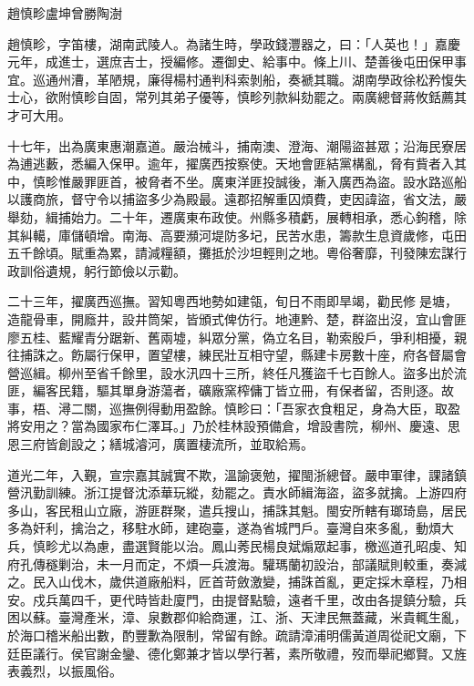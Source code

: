 
\begin{pinyinscope}
趙慎畛盧坤曾勝陶澍

趙慎畛，字笛樓，湖南武陵人。為諸生時，學政錢灃器之，曰：「人英也！」嘉慶元年，成進士，選庶吉士，授編修。遷御史、給事中。條上川、楚善後屯田保甲事宜。巡通州漕，革陋規，廉得楊村通判科索剝船，奏褫其職。湖南學政徐松矜愎失士心，欲附慎畛自固，常列其弟子優等，慎畛列款糾劾罷之。兩廣總督蔣攸銛薦其才可大用。

十七年，出為廣東惠潮嘉道。嚴治械斗，捕南澳、澄海、潮陽盜甚眾；沿海民寮居為逋逃藪，悉編入保甲。逾年，擢廣西按察使。天地會匪結黨構亂，脅有貲者入其中，慎畛惟嚴罪匪首，被脅者不坐。廣東洋匪投誠後，漸入廣西為盜。設水路巡船以護商旅，督守令以捕盜多少為殿最。遠郡招解重囚煩費，吏因諱盜，省文法，嚴舉劾，緝捕始力。二十年，遷廣東布政使。州縣多積虧，展轉相承，悉心鉤稽，除其糾轕，庫儲頓增。南海、高要瀕河堤防多圮，民苦水患，籌款生息資歲修，屯田五千餘頃。賦重為累，請減糧額，攤抵於沙坦輕則之地。粵俗奢靡，刊發陳宏謀行政訓俗遺規，躬行節儉以示勸。

二十三年，擢廣西巡撫。習知粵西地勢如建瓴，旬日不雨即旱竭，勸民修是塘，造龍骨車，開廕井，設井筒架，皆頒式俾仿行。地連黔、楚，群盜出沒，宜山會匪廖五桂、藍耀青分踞新、舊兩墟，糾眾分黨，偽立名目，勒索殷戶，爭利相擾，親往捕誅之。飭屬行保甲，置望樓，練民壯互相守望，縣建卡房數十座，府各督屬會營巡緝。柳州至省千餘里，設水汛四十三所，終任凡獲盜千七百餘人。盜多出於流匪，編客民籍，驅其單身游蕩者，礦廠窯榨傭丁皆立冊，有保者留，否則逐。故事，梧、潯二關，巡撫例得動用盈餘。慎畛曰：「吾家衣食粗足，身為大臣，取盈將安用之？當為國家布仁澤耳。」乃於桂林設預備倉，增設書院，柳州、慶遠、思恩三府皆創設之；繕城濬河，廣置棲流所，並取給焉。

道光二年，入覲，宣宗嘉其誠實不欺，溫諭褒勉，擢閩浙總督。嚴申軍律，課諸鎮營汛勤訓練。浙江提督沈添華玩縱，劾罷之。責水師緝海盜，盜多就擒。上游四府多山，客民租山立廠，游匪群聚，遣兵搜山，捕誅其魁。閩安所轄有瑯琦島，居民多為奸利，擒治之，移駐水師，建砲臺，遂為省城門戶。臺灣自來多亂，動煩大兵，慎畛尤以為慮，盡選賢能以治。鳳山莠民楊良斌煽眾起事，檄巡道孔昭虔、知府孔傳穟剿治，未一月而定，不煩一兵渡海。驩瑪蘭初設治，部議賦則較重，奏減之。民入山伐木，歲供道廠船料，匠首苛斂激變，捕誅首亂，更定採木章程，乃相安。戍兵萬四千，更代時皆赴廈門，由提督點驗，遠者千里，改由各提鎮分驗，兵困以蘇。臺灣產米，漳、泉數郡仰給商運，江、浙、天津民無蓋藏，米貴輒生亂，於海口稽米船出數，酌豐歉為限制，常留有餘。疏請漳浦明儒黃道周從祀文廟，下廷臣議行。侯官謝金鑾、德化鄭兼才皆以學行著，素所敬禮，歿而舉祀鄉賢。又旌表義烈，以振風俗。


\end{pinyinscope}
